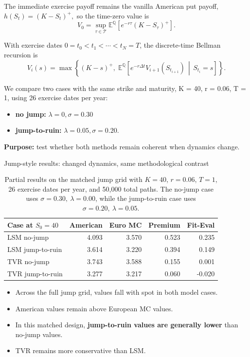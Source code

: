 \documentclass[
  11pt,
  ignorenonframetext,
  aspectratio=169,
]{beamer}
\providecommand{\tightlist}{%
  \setlength{\itemsep}{0pt}\setlength{\parskip}{0pt}}
\begin{document}
\begin{frame}{}
\label{section-3}
The immediate exercise payoff remains the vanilla American put payoff,
\(h(S_t) = (K-S_t)^+,\) so the time-zero value is \[
V_0 = \sup_{\tau \in \mathcal T}
\mathbb E^{\mathbb Q} \left[e^{-r\tau}(K-S_\tau)^+\right].
\]

With exercise dates \(0=t_0<t_1<\cdots<t_N=T\), the discrete-time
Bellman recursion is \[
V_i(s)=
\max\left\{
(K-s)^+,\;
\mathbb{E}^{\mathbb{Q}}\!\left[
e^{-r\Delta t} V_{i+1}(S_{t_{i+1}})
\,\middle|\, S_{t_i}=s
\right]
\right\}.
\]

We compare two cases with the same strike and maturity, K = 40, r =
0.06, T = 1, using 26 exercise dates per year:

\begin{itemize}
\tightlist
\item
  \textbf{no jump:} \(\lambda=0, \sigma=0.30\)
\item
  \textbf{jump-to-ruin:} \(\lambda=0.05, \sigma=0.20\).
\end{itemize}

\textbf{Purpose:} test whether both methods remain coherent when
dynamics change.
\end{frame}

\begin{frame}{Jump-style results: changed dynamics, same methodological
contrast}
\label{jump-style-results-changed-dynamics-same-methodological-contrast}
\begin{table}
\small
\centering
\begin{tabular}{lrrrr}
\toprule
Case at $S_0=40$ & American & Euro MC & Premium & Fit-Eval \\
\midrule
LSM no-jump & 4.093 & 3.570 & 0.523 & 0.235 \\
LSM jump-to-ruin & 3.614 & 3.220 & 0.394 & 0.149 \\
TVR no-jump & 3.743 & 3.588 & 0.155 & 0.001 \\
TVR jump-to-ruin & 3.277 & 3.217 & 0.060 & -0.020 \\
\bottomrule
\end{tabular}
\caption{Partial results on the matched jump grid with $K=40$, $r=0.06$, $T=1$, 26 exercise dates per year, and 50{,}000 total paths. The no-jump case uses $\sigma=0.30,\ \lambda=0.00$, while the jump-to-ruin case uses $\sigma=0.20,\ \lambda=0.05$.}
\end{table}

\begin{itemize}
\item
  Across the full jump grid, values fall with spot in both model cases.
\item
  American values remain above European MC values.
\item
  In this matched design, \textbf{jump-to-ruin values are generally
  lower} than no-jump values.
\item
  TVR remains more conservative than LSM.
\end{itemize}
\end{frame}
\end{document}
